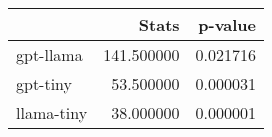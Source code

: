 \begin{tabular}{lrr}
\toprule
 & Stats & p-value \\
\midrule
gpt-llama & 141.500000 & 0.021716 \\
gpt-tiny & 53.500000 & 0.000031 \\
llama-tiny & 38.000000 & 0.000001 \\
\bottomrule
\end{tabular}
